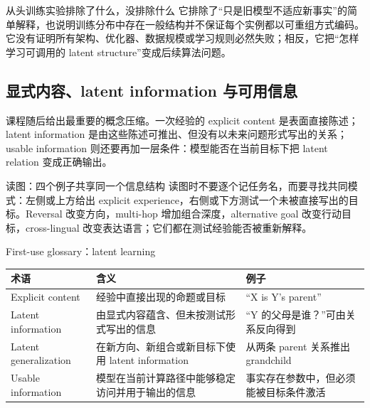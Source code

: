 
\begin{importantbox}{从头训练实验排除了什么，没排除什么}
它排除了“只是旧模型不适应新事实”的简单解释，也说明训练分布中存在一般结构并不保证每个实例都以可重组方式编码。它没有证明所有架构、优化器、数据规模或学习规则必然失败；相反，它把“怎样学习可调用的 latent structure”变成后续算法问题。
\end{importantbox}

\subsection{显式内容、latent information 与可用信息}

课程随后给出最重要的概念压缩。一次经验的 explicit content 是表面直接陈述；latent information 是由这些陈述可推出、但没有以未来问题形式写出的关系；usable information 则还要再加一层条件：模型能否在当前目标下把 latent relation 变成正确输出。


\begin{knowledgebox}{读图：四个例子共享同一个信息结构}
读图时不要逐个记任务名，而要寻找共同模式：左侧或上方给出 explicit experience，右侧或下方测试一个未被直接写出的目标。Reversal 改变方向，multi-hop 增加组合深度，alternative goal 改变行动目标，cross-lingual 改变表达语言；它们都在测试经验能否被重新解释。
\end{knowledgebox}

\begin{knowledgebox}{First-use glossary：latent learning}
\begin{tabularx}{\textwidth}{L{0.23\textwidth}X X}
\toprule
术语 & 含义 & 例子 \\
\midrule
Explicit content & 经验中直接出现的命题或目标 & “X is Y's parent” \\
Latent information & 由显式内容蕴含、但未按测试形式写出的信息 & “Y 的父母是谁？”可由关系反向得到 \\
Latent generalization & 在新方向、新组合或新目标下使用 latent information & 从两条 parent 关系推出 grandchild \\
Usable information & 模型在当前计算路径中能够稳定访问并用于输出的信息 & 事实存在参数中，但必须能被目标条件激活 \\
\bottomrule
\end{tabularx}
\end{knowledgebox}

